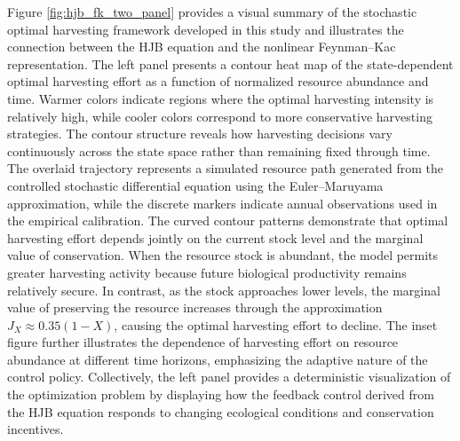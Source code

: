 \documentclass[11pt]{article}
\begin{document}
	Figure \ref{fig:hjb_fk_two_panel} provides a visual summary of the stochastic optimal harvesting framework developed in this study and illustrates the connection between the HJB equation and the nonlinear Feynman--Kac representation. The left panel presents a contour heat map of the state-dependent optimal harvesting effort as a function of normalized resource abundance and time. Warmer colors indicate regions where the optimal harvesting intensity is relatively high, while cooler colors correspond to more conservative harvesting strategies. The contour structure reveals how harvesting decisions vary continuously across the state space rather than remaining fixed through time. The overlaid trajectory represents a simulated resource path generated from the controlled stochastic differential equation using the Euler--Maruyama approximation, while the discrete markers indicate annual observations used in the empirical calibration. The curved contour patterns demonstrate that optimal harvesting effort depends jointly on the current stock level and the marginal value of conservation. When the resource stock is abundant, the model permits greater harvesting activity because future biological productivity remains relatively secure. In contrast, as the stock approaches lower levels, the marginal value of preserving the resource increases through the approximation $J_X\approx0.35(1-X)$, causing the optimal harvesting effort to decline. The inset figure further illustrates the dependence of harvesting effort on resource abundance at different time horizons, emphasizing the adaptive nature of the control policy. Collectively, the left panel provides a deterministic visualization of the optimization problem by displaying how the feedback control derived from the HJB equation responds to changing ecological conditions and conservation incentives.
	
\end{document}
